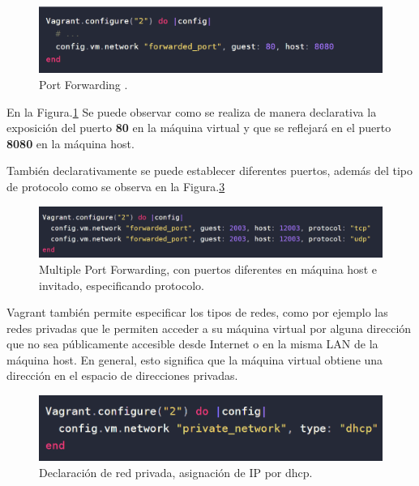 \documentclass[letterpaper, 12pt, oneside]{article}
\begin{document}
    
    \begin{figure}[H]
        \includegraphics[scale=0.8]{img/vagrantport/vagrantportforwading.png}
        \caption{Port Forwarding .}
        \label{fig:forward1}
    \end{figure}
    
    En la Figura.\ref{fig:forward1} Se puede observar como se realiza de manera declarativa la exposición del puerto \textbf{80} en la máquina virtual y que se reflejará en el puerto \textbf{8080} en la máquina host.
    
    También declarativamente se puede establecer diferentes puertos, además del tipo de protocolo como se observa en la Figura.\ref{fig:forward2}
    
    \begin{figure}[H]
        \includegraphics[scale=0.7]{img/vagrantport/portforwaded2.png}
        \caption{Multiple Port Forwarding, con puertos diferentes en máquina host e invitado, especificando protocolo.}
        \label{fig:forward2}
    \end{figure}
    Vagrant también permite especificar los tipos de redes, como por ejemplo las redes privadas que le permiten acceder a su máquina virtual por alguna dirección que no sea públicamente accesible desde Internet o en la misma LAN de la máquina host. En general, esto significa que la  máquina virtual obtiene una dirección en el espacio de direcciones privadas.
    \begin{figure}[H]
        \includegraphics[scale=1.2]{img/vagrantport/privadadhcp.png}
        \caption{Declaración de red privada, asignación de IP por dhcp.}
        \label{fig:forward2}
    \end{figure}
    
\end{document}
